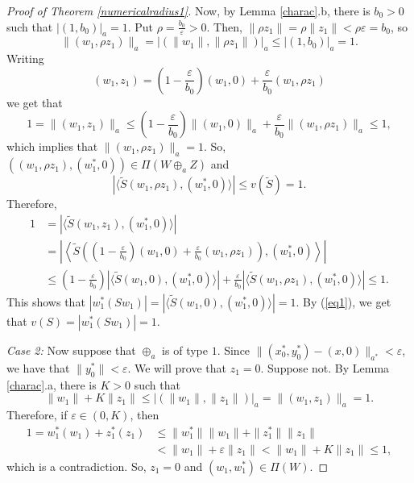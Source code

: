 \documentclass[10pt,a4paper]{amsart}
\theoremstyle{plain}
\theoremstyle{definition}
\newcommand{\eps}{\varepsilon}
\renewcommand{\leq}{\leqslant}
\begin{document}
\begin{proof}[Proof of Theorem \ref{numericalradius1}]
Now, by Lemma \ref{charac}.b, there is $b_0 > 0$ such that $|(1, b_0)|_a = 1$. Put $\rho = \frac{b_0}{\eps} > 0$. Then, $\|\rho z_1\| = \rho \|z_1\| < \rho \eps = b_0$, so 
\begin{equation*}
\|(w_1, \rho z_1)\|_a = |(\|w_1\|, \|\rho z_1\|)|_a \leq |(1, b_0)|_a = 1.
\end{equation*} 
Writing
\begin{equation*}
(w_1, z_1) = \left(1 - \frac{\eps}{b_0}\right) (w_1, 0) + \frac{\eps}{b_0} (w_1, \rho z_1)
\end{equation*}
we get that
\begin{equation*}
1 = \|(w_1, z_1)\|_a \leq \left(1 - \frac{\eps}{b_0} \right) \|(w_1, 0)\|_a + \frac{\eps}{b_0}\|(w_1, \rho z_1)\|_a \leq 1,
\end{equation*}
which implies that $\|(w_1, \rho z_1)\|_a = 1$. So, $((w_1, \rho z_1), (w_1^*, 0)) \in \Pi(W \oplus_a Z)$ and
\begin{equation*}
|\langle \widetilde{S}(w_1, \rho z_1), (w_1^*, 0) \rangle| \leq v(\widetilde{S}) = 1.
\end{equation*}
Therefore,
\begin{align*}
1 &= |\langle \widetilde{S}(w_1, z_1), (w_1^*, 0) \rangle| \\
&= \left| \left\langle \widetilde{S} \left(	\left(1 - \frac{\eps}{b_0}\right) (w_1, 0) + \frac{\eps}{b_0} (w_1, \rho z_1) \right), (w_1^*, 0) \right\rangle \right| \\
&\leq \left(1 - \frac{\eps}{b_0}\right) | \langle \widetilde{S}(w_1, 0), (w_1^*, 0) \rangle| + \frac{\eps}{b_0} | \langle \widetilde{S}(w_1, \rho z_1), (w_1^*, 0) \rangle| \leq 1.
\end{align*}
This shows that $|w_1^*(Sw_1)| = | \langle \widetilde{S}(w_1, 0), (w_1^*, 0) \rangle| = 1$. By (\ref{eq1}), we get that $v(S) = |w_1^*(Sw_1)| = 1$.



\noindent
{\it Case 2:} Now suppose that $\oplus_a$ is of type $1$. Since $\|(x_0^*, y_0^*) - (x, 0)\|_{a^*} < \eps$, we have that $\|y_0^*\| < \eps$. We will prove that $z_1 = 0$. Suppose not. By Lemma \ref{charac}.a, there is $K > 0$ such that
\begin{equation*}
\|w_1\| + K \|z_1\| \leq | (\|w_1\|, \|z_1\|)|_a = \|(w_1, z_1)\|_a = 1.
\end{equation*}
Therefore, if $\eps \in (0, K)$, then
\begin{align*}
1 = w_1^*(w_1) + z_1^*(z_1) &\leq \|w_1^*\|\|w_1\| + \|z_1^*\|\|z_1\| \\
&< \|w_1\| + \eps \|z_1\| < \|w_1\| + K \|z_1\| \leq 1,
\end{align*}
which is a contradiction. So, $z_1 = 0$ and $(w_1, w_1^*) \in \Pi(W)$.



\end{proof}
\end{document}
